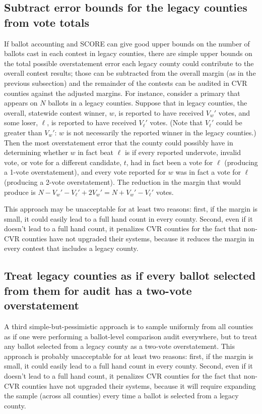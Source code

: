 \documentclass[12pt]{article}
\begin{document}
\subsection{Subtract error bounds for the legacy counties from vote totals}
If ballot accounting and SCORE can give good upper bounds on the number of ballots cast in
each contest in legacy counties, there are simple upper bounds on the total
possible overstatement error each legacy county could contribute to the overall contest
results; those can be subtracted from the overall margin (as in the previous subsection) and the
remainder of the contests can be audited in CVR counties against the adjusted margins.
For instance, consider a primary that appears on $N$ ballots in a legacy counties.
Suppose that in legacy counties, the overall, statewide contest winner, $w$, is reported to have received $V_w'$ votes, and some loser, $\ell$, is reported to have received $V_\ell'$ votes. 
(Note that $V_\ell'$ could be greater than $V_w'$: $w$ is not necessarily the reported winner in the legacy counties.)
Then the most overstatement error that the county could possibly have in determining whether
$w$ in fact beat $\ell$ is if every reported undervote, invalid vote, or vote for a different candidate, $t$, had 
in fact been a vote for $\ell$ (producing a 1-vote overstatement), and every vote reported for 
$w$ was in fact a vote for $\ell$ (producing a 2-vote overstatement).
The reduction in the margin that would produce is 
$N - V_w' - V_\ell' + 2V_w' = N + V_w' - V_\ell'$ votes.

This approach may be unacceptable for at least two reasons:
first, if the margin is small, it could easily lead to a full hand count in every county.
Second, even if it doesn't lead to a full hand count, it penalizes CVR counties for the
fact that non-CVR counties have not upgraded their systems, because it reduces the
margin in every contest that includes a legacy county. 

\subsection{Treat legacy counties as if every ballot selected from them for audit has a two-vote overstatement}
A third simple-but-pessimistic approach is to sample uniformly from all counties as if one
were performing a ballot-level comparison audit everywhere,  but to 
treat any ballot
selected from a legacy county as a two-vote overstatement.
This approach is probably unacceptable for at least two reasons:
first, if the margin is small, it could easily lead to a full hand count in every county.
Second, even if it doesn't lead to a full hand count, it penalizes CVR counties for the
fact that non-CVR counties have not upgraded their systems, because it will require expanding
the sample (across all counties) every time a ballot is selected from a legacy county.
\end{document}
